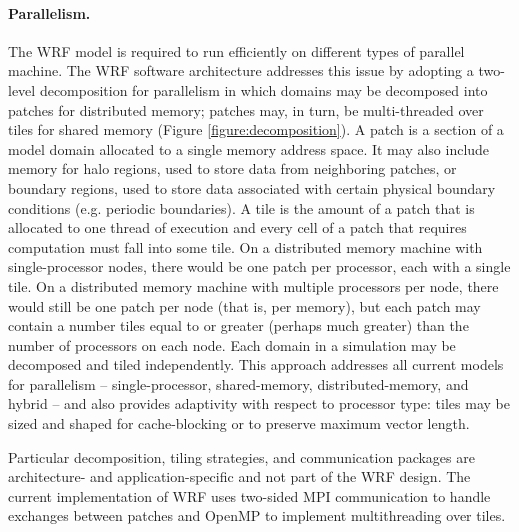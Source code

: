 \paragraph{Parallelism.}
\label{asf_patch}
The WRF model is required to run efficiently on different types of
parallel machine. The WRF software architecture
addresses this issue by adopting a two-level decomposition for
parallelism in which domains may be decomposed into patches for
distributed memory; patches may, in turn, be multi-threaded over tiles
for shared memory (Figure \ref{figure:decomposition}). A patch is a
section of a model domain allocated to a single memory address space.
It may also include memory for halo regions, used to store data from
neighboring patches, or boundary regions, used to store data associated
with certain physical boundary conditions (e.g. periodic boundaries).
A tile is the amount of a patch that is allocated to one thread of
execution and every cell of a patch that requires computation must fall
into some tile. On a distributed memory machine with single-processor
nodes, there would be one patch per processor, each with a single tile.
On a distributed memory machine with multiple processors per node,
there would still be one patch per node (that is, per memory), but each
patch may contain a number tiles equal to or greater (perhaps much
greater) than the number of processors on each node.  Each domain in a
simulation may be decomposed and tiled independently.  This approach
addresses all current models for parallelism -- single-processor,
shared-memory, distributed-memory, and hybrid -- and also provides
adaptivity with respect to processor type: tiles may be sized and
shaped for cache-blocking or to preserve maximum vector length.

Particular decomposition, tiling strategies, and communication packages
are architecture- and application-specific and not part of the
WRF design.  The current implementation of WRF
uses two-sided MPI communication to handle exchanges between
patches and OpenMP to implement multithreading over tiles.

